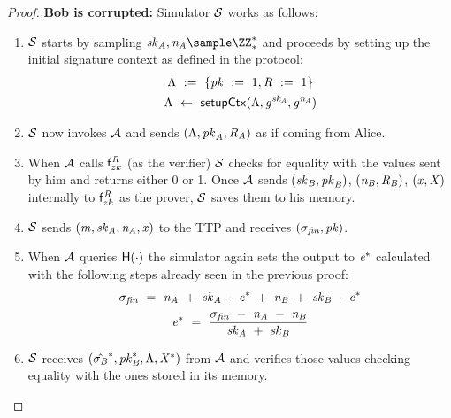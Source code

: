 \begin{proof}
    \textbf{Bob is corrupted: } Simulator $\mathcal{S}$ works as follows:
    \begin{enumerate}
        \item $\mathcal{S}$ starts by sampling $\varSecKeyAlice, \varNonceAlice \sample \cnstIntegersPrimeWithoutZero{*}$ and proceeds by setting up the initial signature context as defined in the protocol:
        \begin{gather*}
            \Lambda ~:=~ \{ \mathit{pk} ~:=~ 1, \mathit{R} ~:=~ 1 \} \\
            \Lambda ~\leftarrow~ \mathsf{setupCtx}( \Lambda, \mathit{g}^{\mathit{sk}_{\mathit{A}}}, \mathit{g}^{\mathit{\mathit{n}_{\mathit{A}}}} ) \\
        \end{gather*}
        \item $\mathcal{S}$ now invokes $\mathcal{A}$ and sends $(\Lambda, \mathit{pk}_{\mathit{A}}, \mathit{R}_{\mathit{A}})$ as if coming from Alice.
        \item When $\mathcal{A}$ calls $\mathsf{f}^{\mathit{R}}_{zk}$ (as the verifier) $\mathcal{S}$ checks for equality with the values sent by him and returns either 0 or 1.
        Once $\mathcal{A}$ sends $(\mathit{sk}_{\mathit{B}}, \mathit{pk}_{\mathit{B}})$, $(\mathit{\mathit{n}_{\mathit{B}}}, \mathit{R}_{\mathit{B}})$, $(\mathit{x}, \mathit{X})$ internally to $\mathsf{f}^{\mathit{R}}_{zk}$ as the prover, $\mathcal{S}$ saves them to his memory.
        \item $\mathcal{S}$ sends $(\mathit{m}, \mathit{sk}_{\mathit{A}}, \mathit{\mathit{n}_{\mathit{A}}}, \mathit{x})$ to the TTP and receives $(\sigma_{\mathit{fin}}, \mathit{pk})$.
        \item When $\mathcal{A}$ queries $\mathsf{H} (\cdot)$ the simulator again sets the output to $\mathit{e}^*$ calculated with the following steps already seen in the previous proof:
        \begin{gather*}
            \sigma_{\mathit{fin}} ~=~ \mathit{\mathit{n}_{\mathit{A}}} ~+~ \mathit{sk}_{\mathit{A}} ~\cdot~ \mathit{e}^* ~+~ \mathit{\mathit{n}_{\mathit{B}}} ~+~ \mathit{sk}_{\mathit{B}} ~\cdot~ \mathit{e}^* \\
            \mathit{e}^* ~=~ \frac{\sigma_{\mathit{fin}} ~-~ \mathit{\mathit{n}_{\mathit{A}}} ~-~ \mathit{\mathit{n}_{\mathit{B}}}}{\mathit{sk}_{\mathit{A}} ~+~ \mathit{sk}_{\mathit{B}}}
        \end{gather*}
        \item $\mathcal{S}$ receives $(\hat{\sigma_{\mathit{B}}}^*, \mathit{pk}_{\mathit{B}}^*, \Lambda, \mathit{X}^*)$ from $\mathcal{A}$ and verifies those values checking equality with the ones stored in its memory.

\end{enumerate}
\end{proof}
